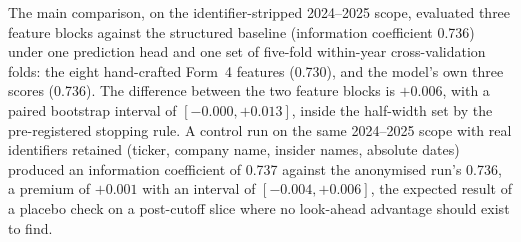 \documentclass[logo,msc,ai]{infthesis}        %
\begin{document}
The main comparison, on the identifier-stripped 2024--2025 scope, evaluated three feature blocks against the structured baseline (information coefficient 0.736) under one prediction head and one set of five-fold within-year cross-validation folds: the eight hand-crafted Form~4 features (0.730), and the model's own three scores (0.736). The difference between the two feature blocks is $+0.006$, with a paired bootstrap interval of $[-0.000, +0.013]$, inside the half-width set by the pre-registered stopping rule. A control run on the same 2024--2025 scope with real identifiers retained (ticker, company name, insider names, absolute dates) produced an information coefficient of 0.737 against the anonymised run's 0.736, a premium of $+0.001$ with an interval of $[-0.004, +0.006]$, the expected result of a placebo check on a post-cutoff slice where no look-ahead advantage should exist to find.
\end{document}
